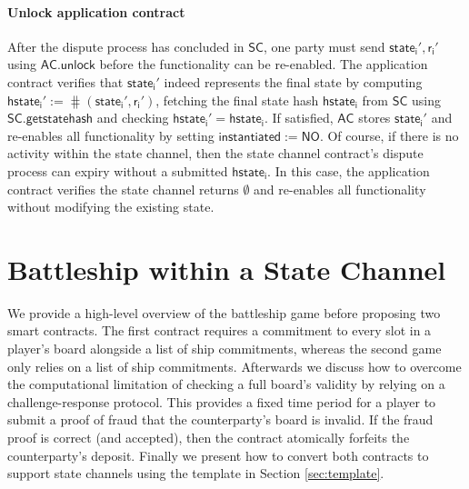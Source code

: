 \documentclass{llncs}
\newcommand{\instantiated}{\mathsf{instantiated}}
\newcommand{\instantiatedno}{\mathsf{NO}}
\newcommand{\hslot}{\mathsf{hslot}}
\newcommand{\hship}{\mathsf{hship}}
\newcommand{\hstatei}{\mathsf{hstate}_{\monotoniccounter}}
\newcommand{\monotoniccounter}{\mathsf{i}}
\newcommand{\stateinfoi}{\mathsf{state}_{\mathsf{i}}}
\newcommand{\rani}{\mathsf{r}_{\mathsf{i}}}
\newcommand{\statechannel}{\mathsf{SC}}
\newcommand{\statechannelgetcommitment}{\mathsf{SC}.\mathsf{getstatehash}}
\newcommand{\appcontract}{\mathsf{AC}}
\newcommand{\appunlock}{\mathsf{AC.unlock}}
\begin{document}
\paragraph{Unlock application contract}

After the dispute process has concluded in $\statechannel$, one party must send  $\stateinfoi',\rani'$ using $\appunlock$ before the functionality can be re-enabled.
The application contract verifies that $\stateinfoi'$  indeed represents the final state by computing $\hstatei' := \hash(\stateinfoi', \rani')$, fetching the final state hash $\hstatei$ from $\statechannel$ using $\statechannelgetcommitment$ and checking  $\hstatei' = \hstatei$. 
If satisfied, $\appcontract$ stores $\stateinfoi'$ and re-enables all functionality by setting $\instantiated :=  \instantiatedno$. 
Of course, if there is no activity within the state channel, then the state channel contract's dispute process can expiry without a submitted $\hstatei$.
In this case, the application contract verifies the state channel returns $\emptyset$ and re-enables all functionality without modifying the existing state. 



\section{Battleship within a State Channel} 

We provide a high-level overview of the battleship game before proposing two smart contracts. 
The first contract requires a commitment to every slot in a player's board alongside a list of ship commitments, whereas the second game only relies on a list of ship commitments. 
Afterwards we discuss how to overcome the computational limitation of checking a full board's validity by relying on a challenge-response protocol. 
This provides a fixed time period for a player to submit a proof of fraud that the counterparty's board is invalid.
If the fraud proof is correct (and accepted), then the contract atomically forfeits the counterparty's deposit. 
Finally we present how to convert both contracts to support state channels using the template in Section \ref{sec:template}. 
\end{document}
